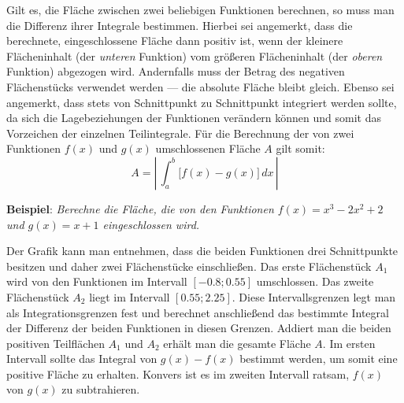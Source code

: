 \pagebreak


Gilt es, die Fl\"{a}che zwischen zwei beliebigen Funktionen berechnen, so muss man die Differenz ihrer Integrale bestimmen. Hierbei sei angemerkt, dass die berechnete, eingeschlossene Fl\"{a}che dann positiv ist, wenn der kleinere Fl\"{a}cheninhalt (der \emph{unteren} Funktion) vom gr\"{o}\ss{}eren Fl\"{a}cheninhalt (der \emph{oberen} Funktion) abgezogen wird. Andernfalls muss der Betrag des negativen Fl\"{a}chenst\"{u}cks verwendet werden --- die absolute Fl\"{a}che bleibt gleich. Ebenso sei angemerkt, dass stets von Schnittpunkt zu Schnittpunkt integriert werden sollte, da sich die Lagebeziehungen der Funktionen ver\"{a}ndern k\"{o}nnen und somit das Vorzeichen der einzelnen Teilintegrale. F\"{u}r die Berechnung der von zwei Funktionen $f(x)$ und $g(x)$ umschlossenen Fl\"{a}che $A$ gilt somit: $$A = \left| \, \int_a^b \big[f(x) - g(x)\big] \, dx \, \right|$$

\textbf{Beispiel}: \emph{Berechne die Fl\"{a}che, die von den Funktionen $f(x) = x^3 - 2x^2 + 2$ und $g(x) = x + 1$ eingeschlossen wird.}

\extrapar

\begin{figure}[h!]
	\centering
\end{figure}

Der Grafik kann man entnehmen, dass die beiden Funktionen drei Schnittpunkte besitzen und daher zwei Fl\"{a}chenst\"{u}cke einschlie\ss{}en. Das erste Fl\"{a}chenst\"{u}ck $A_1$ wird von den Funktionen im Intervall $[-0.8 ; 0.55]$ umschlossen. Das zweite Fl\"{a}chenst\"{u}ck $A_2$ liegt im Intervall $[0.55 ; 2.25]$. Diese Intervallsgrenzen legt man als Integrationsgrenzen fest und berechnet anschlie\ss{}end das bestimmte Integral der Differenz der beiden Funktionen in diesen Grenzen. Addiert man die beiden positiven Teilfl\"{a}chen $A_1$ und $A_2$ erh\"{a}lt man die gesamte Fl\"{a}che $A$. Im ersten Intervall sollte das Integral von $g(x) - f(x)$ bestimmt werden, um somit eine positive Fl\"{a}che zu erhalten. Konvers ist es im zweiten Intervall ratsam, $f(x)$ von $g(x)$ zu subtrahieren. 

